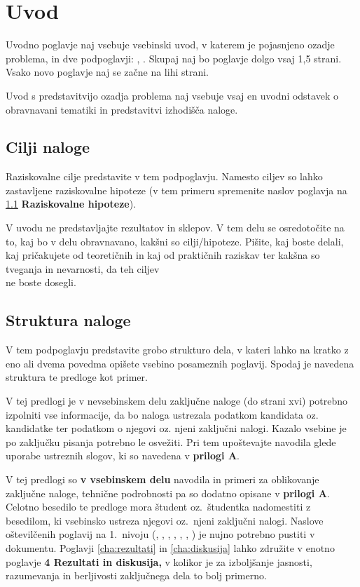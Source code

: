 \chapter{Uvod}\label{cha:uvod}

Uvodno poglavje naj vsebuje vsebinski uvod, v katerem je pojasnjeno ozadje problema, in dve podpoglavji: , . Skupaj naj bo poglavje  dolgo vsaj 1,5 strani. Vsako novo poglavje naj se začne na lihi strani.

Uvod s predstavitvijo ozadja problema naj vsebuje vsaj en uvodni odstavek o obravnavani tematiki in predstavitvi izhodišča naloge.

\section{Cilji naloge}\label{sec:cilji_naloge}
Raziskovalne cilje predstavite v tem podpoglavju. Namesto ciljev so lahko zastavljene raziskovalne hipoteze (v tem primeru spremenite naslov poglavja na \ref{sec:cilji_naloge} \textbf{Raziskovalne hipoteze}).

V uvodu ne predstavljajte rezultatov in sklepov. V tem delu se osredotočite na to, kaj bo v delu obravnavano, kakšni so cilji/hipoteze. Pišite, kaj boste delali, kaj pričakujete od teoretičnih in kaj od praktičnih raziskav ter kakšna so tveganja in nevarnosti, da teh ciljev\\
ne boste dosegli.

\section{Struktura naloge}\label{sec:struktura_naloge}
V tem podpoglavju predstavite grobo strukturo dela, v kateri lahko na kratko z eno ali dvema povedma opišete vsebino posameznih poglavij. Spodaj je navedena struktura te predloge kot primer.

V tej predlogi je v nevsebinskem delu zaključne naloge (do strani xvi) potrebno izpolniti vse informacije, da bo naloga ustrezala podatkom kandidata oz. kandidatke ter podatkom o njegovi oz. njeni zaključni nalogi. Kazalo vsebine je po zaključku pisanja potrebno le osvežiti. Pri tem upoštevajte navodila glede uporabe ustreznih slogov, ki so navedena v \textbf{prilogi A}.

	V tej predlogi so \textbf{v vsebinskem delu} navodila in primeri za oblikovanje zaključne naloge, tehnične podrobnosti pa so dodatno opisane v \textbf{prilogi A}. Celotno besedilo te predloge mora študent oz.~študentka nadomestiti z besedilom, ki vsebinsko ustreza njegovi oz.~njeni zaključni nalogi. Naslove oštevilčenih poglavij na 1.~nivoju (,  , , , , , \textbf{}) je nujno potrebno pustiti v dokumentu. Poglavji \ref{cha:rezultati} in \ref{cha:diskusija} lahko združite v enotno poglavje \textbf{4 Rezultati in diskusija,} v kolikor je za izboljšanje jasnosti, razumevanja in berljivosti zaključnega dela to bolj primerno.